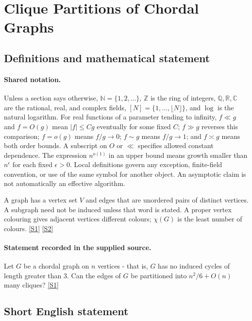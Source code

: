 \documentclass[11pt,a4paper]{article}
\newcommand{\N}{\mathbb{N}}
\newcommand{\Z}{\mathbb{Z}}
\newcommand{\Q}{\mathbb{Q}}
\newcommand{\R}{\mathbb{R}}
\newcommand{\C}{\mathbb{C}}
\newcommand{\sref}[2]{\hyperlink{source:#1:#2}{[S#2]}}
\begin{document}
\section{Clique Partitions of Chordal Graphs}\label{statement}


\subsection{Definitions and mathematical statement}

\paragraph{Shared notation.}Unless a section says otherwise, $\N=\{1,2,\ldots\}$,
$\Z$ is the ring of integers, $\Q,\R,\C$ are the rational, real, and complex
fields, $[N]=\{1,\ldots,\lfloor N\rfloor\}$, and $\log$ is the natural
logarithm. For real functions of a parameter tending to infinity,
$f\ll g$ and $f=O(g)$ mean $|f|\leq Cg$ eventually for some fixed $C$;
$f\gg g$ reverses this comparison; $f=o(g)$ means $f/g\to0$;
$f\sim g$ means $f/g\to1$; and $f\asymp g$ means both order bounds.
A subscript on $O$ or $\ll$ specifies allowed constant dependence.
The expression $n^{o(1)}$ in an upper bound means growth smaller than
$n^\epsilon$ for each fixed $\epsilon>0$. Local definitions govern any
exception, finite-field convention, or use of the same symbol for another
object. An asymptotic claim is not automatically an effective algorithm.



A graph has a vertex set $V$ and edges that are unordered pairs of distinct vertices. A subgraph need not be induced unless that word is stated. A proper vertex colouring gives adjacent vertices different colours; $\chi(G)$ is the least number of colours. \sref{statement}{1} \sref{statement}{2}

\paragraph{Statement recorded in the supplied source.}
Let $G$ be a chordal graph on $n$ vertices - that is, $G$ has no induced cycles of length greater than $3$. Can the edges of $G$ be partitioned into $n^2/6+O(n)$ many cliques? \sref{statement}{1}

\subsection{Short English statement}
\end{document}
